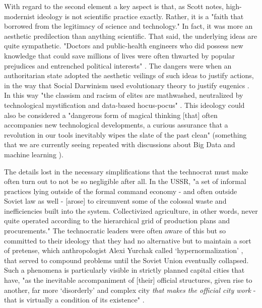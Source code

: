 With regard to the second element a key aspect is that, as Scott notes, high-modernist ideology is not scientific practice exactly. Rather, it is a "faith that borrowed from the legitimacy of science and technology." In fact, it was more an aesthetic predilection than anything scientific. That said, the underlying ideas are quite sympathetic. "Doctors and public-health engineers who did possess new knowledge that could save millions of lives were often thwarted by popular prejudices and entrenched political interests"  \cite{scottSeeingStateHow2020}. The dangers were when an authoritarian state adopted the aesthetic veilings of such ideas to justify actions, in the way that Social Darwinism used evolutionary theory to justify eugenics \cite{harrisPaloAltoHistory2023}. In this way "the classism and racism of elites are mathwashed, neutralized by technological mystification and data-based hocus-pocus" \cite{eubanksAutomatingInequalityHow2018}. This ideology could also be considered a "dangerous form of magical thinking [that] often accompanies new technological developments, a curious assurance that a revolution in our tools inevitably wipes the slate of the past clean" \cite{eubanksAutomatingInequalityHow2018} (something that we are currently seeing repeated with discussions about Big Data and machine learning \cite{barnesBigDataSocial2014}).

The details lost in the necessary simplifications that the technocrat must make often turn out to not be so negligible after all. In the USSR, "a set of informal practices lying outside of the formal command economy - and often outside Soviet law as well - [arose] to circumvent some of the colossal waste and inefficiencies built into the system. Collectivized agriculture, in other words, never quite operated according to the hierarchical grid of production plans and procurements." \cite{scottSeeingStateHow2020} The technocratic leaders were often aware of this but so committed to their ideology that they had no alternative but to maintain a sort of pretense, which anthropologist Alexi Yurchak called `hypernormalization' \cite{yurchakEverythingWasForever2005}, that served to compound problems until the Soviet Union eventually collapsed. Such a phenomena is particularly visible in strictly planned capital cities that have, "as the inevitable accompaniment of [their] official structures, given rise to another, far more `disorderly' and complex city \textit{that makes the official city work} - that is virtually a condition of its existence" \cite{scottSeeingStateHow2020}.

